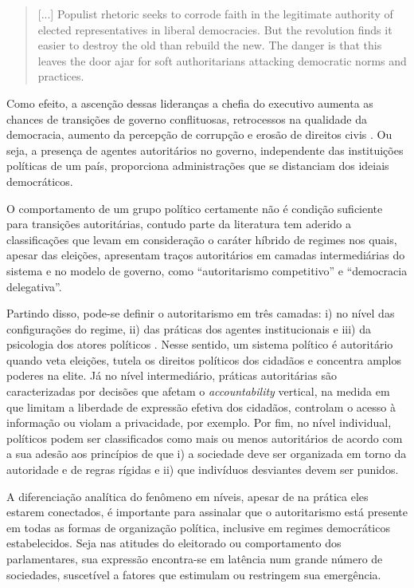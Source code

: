 \documentclass[
12pt,				%
openright,			%
twoside,			%
a4paper,			%
english,			%
french,				%
spanish,			%
brazil				%
]{abntex2}
\begin{document}
\begin{quote}
	[...] Populist rhetoric seeks to corrode faith in the legitimate
	authority of elected representatives in liberal democracies. But the revolution finds it easier to destroy the old than rebuild the new. The danger is that this leaves the door ajar for soft authoritarians attacking democratic norms and practices. \cite{norris2019cultural}
\end{quote}

Como efeito, a ascenção dessas lideranças a chefia do executivo aumenta as chances de transições de governo conflituosas, retrocessos na qualidade da democracia, aumento da percepção de corrupção e erosão de direitos civis \cite{mounk2018thepopulist}. Ou seja, a presença de agentes autoritários no governo, independente das instituições políticas de um país, proporciona administrações que se distanciam dos ideiais democráticos.

O comportamento de um grupo político certamente não é condição suficiente para transições autoritárias, contudo  parte da literatura tem aderido a classificações que levam em consideração o caráter híbrido de regimes nos quais, apesar das eleições, apresentam traços autoritários em camadas intermediárias do sistema e no modelo de governo, como ``autoritarismo competitivo''\cite{levitsky2002elections,levitsky2006competitive} e ``democracia delegativa''\cite{o1994delegative}.
 
Partindo disso, pode-se definir o autoritarismo em três camadas: i) no nível das configurações do regime, ii) das práticas dos agentes institucionais e iii) da psicologia dos atores políticos \cite{glasius2018authoritarianism}. Nesse sentido, um sistema político é autoritário quando veta eleições, tutela os direitos políticos dos cidadãos e concentra amplos poderes na elite. Já no nível intermediário, práticas autoritárias são caracterizadas por decisões que afetam o \emph{accountability} vertical, na medida em que limitam a liberdade de expressão efetiva dos cidadãos, controlam o acesso à informação ou violam a privacidade, por exemplo. Por fim, no nível individual, políticos podem ser classificados como mais ou menos autoritários de acordo com a sua adesão aos princípios de que i) a sociedade deve ser organizada em torno da autoridade e de regras rígidas e ii) que indivíduos desviantes devem ser punidos.

A diferenciação analítica do fenômeno em níveis, apesar de na prática eles estarem conectados, é importante para assinalar que o autoritarismo está presente em todas as formas de organização política, inclusive em regimes democráticos estabelecidos. Seja nas atitudes do eleitorado ou comportamento dos parlamentares, sua expressão encontra-se em latência num grande número de sociedades, suscetível a fatores que estimulam ou restringem sua emergência. 
\end{document}
